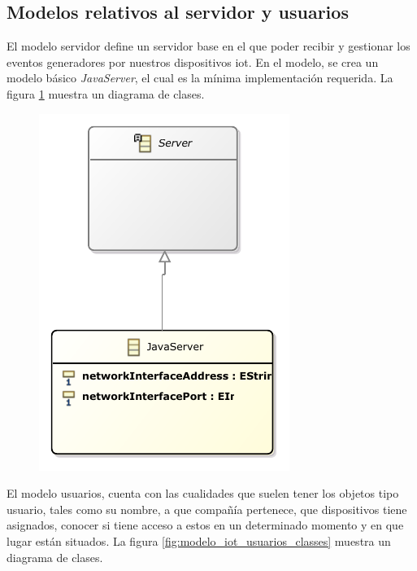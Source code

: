 \subsection{Modelos relativos al servidor y usuarios}

El modelo servidor define un servidor base en el que poder recibir y gestionar los eventos generadores por nuestros dispositivos \gls{iot}. En el modelo, se crea un modelo básico \textit{JavaServer}, el cual es la mínima implementación requerida. La figura \ref{fig:modelo_iot_servidor_classes} muestra un diagrama de clases. 

\begin{figure}
	\centering
    \includegraphics[height=0.3\textheight]{images/models/servers_class_diagram.pdf}
    \label{fig:modelo_iot_servidor_classes}
\end{figure}

El modelo usuarios, cuenta con las cualidades que suelen tener los objetos tipo usuario, tales como su nombre, a que compañía pertenece, que dispositivos tiene asignados, conocer si tiene acceso a estos en un determinado momento y en que lugar están situados. La figura \ref{fig:modelo_iot_usuarios_classes} muestra un diagrama de clases.

